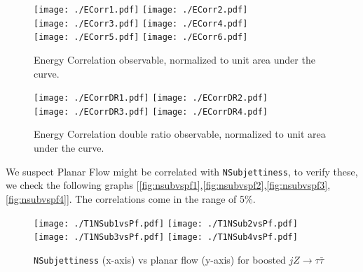 \begin{figure}[H]
    \begin{center}
        \texttt{[image: ./ECorr1.pdf]}
        \texttt{[image: ./ECorr2.pdf]}\\
        \texttt{[image: ./ECorr3.pdf]}
        \texttt{[image: ./ECorr4.pdf]}\\
        \texttt{[image: ./ECorr5.pdf]}
        \texttt{[image: ./ECorr6.pdf]}\\
        \caption{ Energy Correlation observable, normalized to unit area under the curve. }
        \label{fig:ECorr}
    \end{center}
\end{figure}

\begin{figure}[H]
    \begin{center}
        \texttt{[image: ./ECorrDR1.pdf]}
        \texttt{[image: ./ECorrDR2.pdf]}\\
        \texttt{[image: ./ECorrDR3.pdf]}
        \texttt{[image: ./ECorrDR4.pdf]}\\
        \caption{ Energy Correlation double ratio observable, normalized to unit area under the curve. }
        \label{fig:ECorrDR}
    \end{center}
\end{figure}
{\newpage}
We suspect Planar Flow might be correlated with {\tt NSubjettiness}, to verify these, we check the following graphs [\autoref{fig:nsubvspf1},\autoref{fig:nsubvspf2},\autoref{fig:nsubvspf3},\autoref{fig:nsubvspf4}]. The correlations come in the range of 5\%.

\begin{figure}[H]
    \begin{center}
        \texttt{[image: ./T1NSub1vsPf.pdf]}
        \texttt{[image: ./T1NSub2vsPf.pdf]}\\
        \texttt{[image: ./T1NSub3vsPf.pdf]}
        \texttt{[image: ./T1NSub4vsPf.pdf]}\\
        \caption{ {\tt NSubjettiness} (x-axis) vs planar flow (y-axis) for boosted $jZ\rightarrow \tau \bar{\tau}$ }
        \label{fig:nsubvspf1}
    \end{center}
\end{figure}

